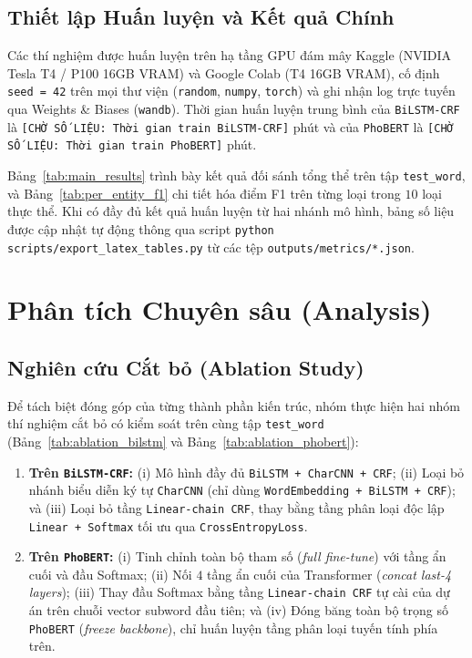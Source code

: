 \documentclass[11pt,a4paper,twocolumn]{article}
\begin{document}
\subsection{Thiết lập Huấn luyện và Kết quả Chính}
\label{sec:main_results}
Các thí nghiệm được huấn luyện trên hạ tầng GPU đám mây Kaggle (NVIDIA Tesla T4 / P100 16GB VRAM) và Google Colab (T4 16GB VRAM), cố định \texttt{seed = 42} trên mọi thư viện (\texttt{random}, \texttt{numpy}, \texttt{torch}) và ghi nhận log trực tuyến qua Weights \& Biases (\texttt{wandb}). Thời gian huấn luyện trung bình của \texttt{BiLSTM-CRF} là \texttt{[CHỜ SỐ LIỆU: Thời gian train BiLSTM-CRF]} phút và của \texttt{PhoBERT} là \texttt{[CHỜ SỐ LIỆU: Thời gian train PhoBERT]} phút.




Bảng~\ref{tab:main_results} trình bày kết quả đối sánh tổng thể trên tập \texttt{test\_word}, và Bảng~\ref{tab:per_entity_f1} chi tiết hóa điểm F1 trên từng loại trong $10$ loại thực thể. Khi có đầy đủ kết quả huấn luyện từ hai nhánh mô hình, bảng số liệu được cập nhật tự động thông qua script \texttt{python scripts/export\_latex\_tables.py} từ các tệp \texttt{outputs/metrics/*.json}.

\section{Phân tích Chuyên sâu (Analysis)}
\label{sec:analysis}

\subsection{Nghiên cứu Cắt bỏ (Ablation Study)}
\label{sec:ablation}
Để tách biệt đóng góp của từng thành phần kiến trúc, nhóm thực hiện hai nhóm thí nghiệm cắt bỏ có kiểm soát trên cùng tập \texttt{test\_word} (Bảng~\ref{tab:ablation_bilstm} và Bảng~\ref{tab:ablation_phobert}):
\begin{enumerate}
  \item \textbf{Trên \texttt{BiLSTM-CRF}:} (i) Mô hình đầy đủ \texttt{BiLSTM + CharCNN + CRF}; (ii) Loại bỏ nhánh biểu diễn ký tự \texttt{CharCNN} (chỉ dùng \texttt{WordEmbedding + BiLSTM + CRF}); và (iii) Loại bỏ tầng \texttt{Linear-chain CRF}, thay bằng tầng phân loại độc lập \texttt{Linear + Softmax} tối ưu qua \texttt{CrossEntropyLoss}.
  \item \textbf{Trên \texttt{PhoBERT}:} (i) Tinh chỉnh toàn bộ tham số (\textit{full fine-tune}) với tầng ẩn cuối và đầu Softmax; (ii) Nối $4$ tầng ẩn cuối của Transformer (\textit{concat last-4 layers}); (iii) Thay đầu Softmax bằng tầng \texttt{Linear-chain CRF} tự cài của dự án trên chuỗi vector subword đầu tiên; và (iv) Đóng băng toàn bộ trọng số \texttt{PhoBERT} (\textit{freeze backbone}), chỉ huấn luyện tầng phân loại tuyến tính phía trên.
\end{enumerate}
\end{document}

